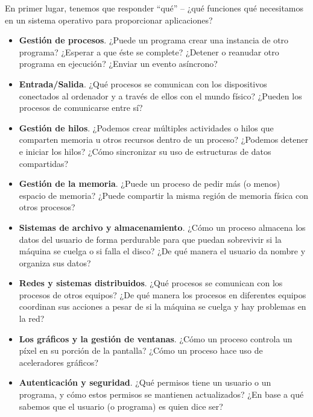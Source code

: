 \documentclass[10pt]{book}
\begin{document}
En primer lugar, tenemos que responder ``qué'' -- ¿qué funciones qué necesitamos en un sistema operativo para proporcionar aplicaciones?
\begin{itemize}
\item \textbf{Gestión de procesos}. ¿Puede un programa crear una instancia de otro programa? ¿Esperar a que éste se complete? ¿Detener o reanudar otro programa en ejecución? ¿Enviar un evento asíncrono?

\item \textbf{Entrada/Salida}. ¿Qué procesos se comunican con los dispositivos conectados al ordenador y a través de ellos con el mundo físico? ¿Pueden los procesos de comunicarse entre sí?

\item \textbf{Gestión de hilos}. ¿Podemos crear múltiples actividades o hilos que comparten memoria u otros recursos dentro de un proceso? ¿Podemos detener e iniciar los hilos? ¿Cómo sincronizar su uso de estructuras de datos compartidas?

\item \textbf{Gestión de la memoria}. ¿Puede un proceso de pedir más (o menos) espacio de memoria? ¿Puede compartir la misma región de memoria física con otros procesos?

\item \textbf{Sistemas de archivo y almacenamiento}. ¿Cómo un proceso almacena los datos del usuario de forma perdurable para que puedan sobrevivir si la máquina se cuelga o si falla el disco? ¿De qué manera el usuario da nombre y organiza sus datos?

\item \textbf{Redes y sistemas distribuidos}. ¿Qué procesos se comunican con los procesos de otros equipos? ¿De qué manera los procesos en diferentes equipos coordinan sus acciones a pesar de si la máquina se cuelga y hay problemas en la red?

\item \textbf{Los gráficos y la gestión de ventanas}. ¿Cómo un proceso controla un píxel en su porción de la pantalla? ¿Cómo un proceso hace uso de aceleradores gráficos?

\item \textbf{Autenticación y seguridad}. ¿Qué permisos tiene un usuario o un programa, y cómo estos permisos se mantienen actualizados? ¿En base a qué sabemos que el usuario (o programa) es quien dice ser?
\end{itemize}
\end{document}
